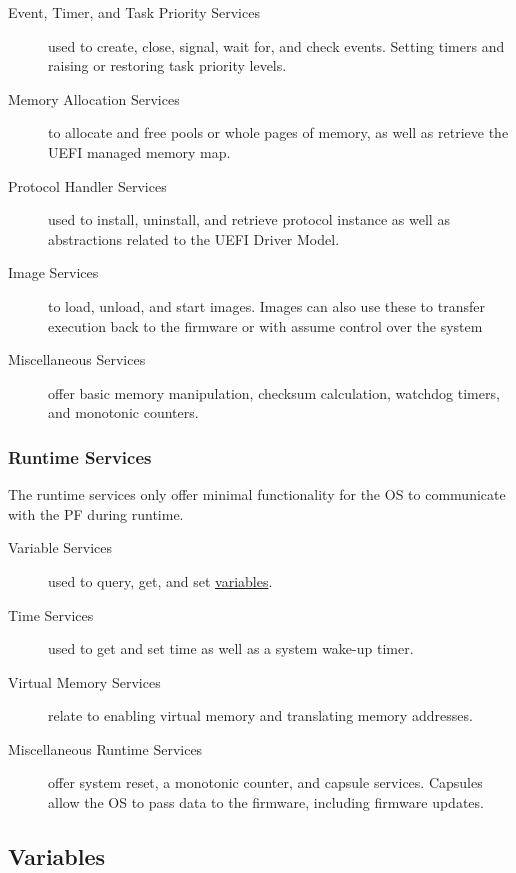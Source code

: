 \begin{description}
    \item [Event, Timer, and Task Priority Services] used to create, close, signal, wait for, and check events. Setting timers and raising or restoring task priority levels.
    \item [Memory Allocation Services] to allocate and free pools or whole pages of memory, as well as retrieve the \ac{UEFI} managed memory map.
    \item [Protocol Handler Services] used to install, uninstall, and retrieve protocol instance as well as abstractions related to the \ac{UEFI} Driver Model.
    \item [Image Services] to load, unload, and start images. Images can also use these to transfer execution back to the firmware or with  assume control over the system
    \item [Miscellaneous Services] offer basic memory manipulation, checksum calculation, watchdog timers, and monotonic counters.
\end{description}

\subsubsection{Runtime Services}

The runtime services only offer minimal functionality for the \ac{OS} to communicate with the \ac{PF} during runtime.

\begin{description}
    \item [Variable Services] used to query, get, and set \hyperref[sec:uefi-pi:uefi:variables]{variables}.
    \item [Time Services] used to get and set time as well as a system wake-up timer.
    \item [Virtual Memory Services] relate to enabling virtual memory and translating memory addresses.
    \item [Miscellaneous Runtime Services] offer system reset, a monotonic counter, and capsule services. Capsules allow the \ac{OS} to pass data to the firmware, including firmware updates.
\end{description}

\subsection{Variables}
\label{sec:uefi-pi:uefi:variables}

